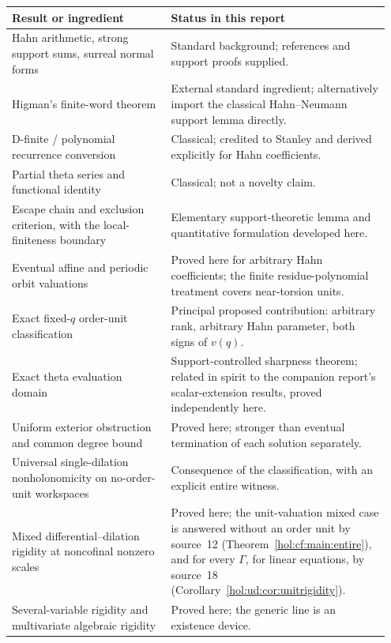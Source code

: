 \documentclass[11pt]{article}
\numberwithin{equation}{section}
\theoremstyle{definition}
\theoremstyle{remark}
\begin{document}
\begin{longtable}{@{}>{\raggedright\arraybackslash}p{0.40\linewidth}
                    >{\raggedright\arraybackslash}p{0.55\linewidth}@{}}
\toprule
Result or ingredient & Status in this report\\
\midrule
\endhead
Hahn arithmetic, strong support sums, surreal normal forms & Standard
background; references and support proofs supplied.\\[4pt]
Higman's finite-word theorem & External standard ingredient; alternatively
import the classical Hahn--Neumann support lemma directly.\\[4pt]
D-finite / polynomial recurrence conversion & Classical; credited to Stanley
and derived explicitly for Hahn coefficients.\\[4pt]
Partial theta series and functional identity & Classical; not a novelty
claim.\\[4pt]
Escape chain and exclusion criterion, with the local-finiteness boundary &
Elementary support-theoretic lemma and quantitative formulation developed
here.\\[4pt]
Eventual affine and periodic orbit valuations & Proved here for arbitrary Hahn
coefficients; the finite residue-polynomial treatment covers near-torsion
units.\\[4pt]
Exact fixed-$q$ order-unit classification & Principal proposed contribution:
arbitrary rank, arbitrary Hahn parameter, both signs of $v(q)$.\\[4pt]
Exact theta evaluation domain & Support-controlled sharpness theorem; related
in spirit to the companion report's scalar-extension results, proved
independently here.\\[4pt]
Uniform exterior obstruction and common degree bound & Proved here; stronger
than eventual termination of each solution separately.\\[4pt]
Universal single-dilation nonholonomicity on no-order-unit workspaces &
Consequence of the classification, with an explicit entire witness.\\[4pt]
Mixed differential--dilation rigidity at noncofinal nonzero scales & Proved
here; the unit-valuation mixed case is answered without an order unit by
source~12 (Theorem~\ref{hol:cf:main:entire}), and for every $\Gamma$, for
linear equations, by source~18
(Corollary~\ref{hol:ud:cor:unitrigidity}).\\[4pt]
Several-variable rigidity and multivariate algebraic rigidity & Proved here;
the generic line is an existence device.\\[4pt]

\end{longtable}
\end{document}
